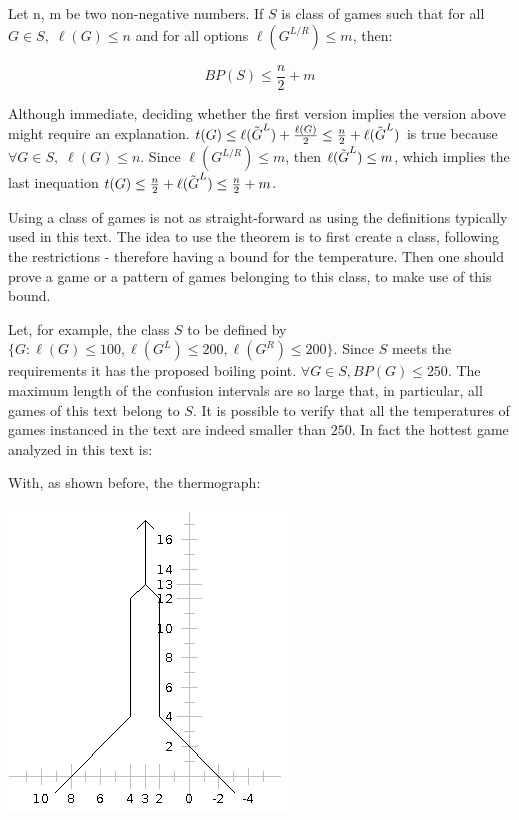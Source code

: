 Let n, m be two non-negative numbers. If $S$ is class of games such that for all $G \in S,\;\ell(G) \leq n$ and for all options $\ell(G^{L/R}) \leq m$, then:

$$
BP(S) \leq \frac{n}{2} + m
$$

Although immediate, deciding whether the first version implies the version above might require an explanation. $t(G) \leq \ell(\tilde{\mbox{$G$}}^L) + \frac{\ell(G)}{2} \leq \frac{n}{2} + \ell(\tilde{\mbox{$G$}}^L)$ is true because $\forall G \in S,\;\ell(G) \leq n$. Since $\ell(G^{L/R}) \leq m$, then $\ell(\tilde{\mbox{$G$}}^L) \leq m$, which implies the last inequation $t(G) \leq \frac{n}{2} + \ell(\tilde{\mbox{$G$}}^L) \leq \frac{n}{2} + m$.

Using a class of games is not as straight-forward as using the definitions typically used in this text. The idea to use the theorem is to first create a class, following the restrictions - therefore having a bound for the temperature. Then one should prove a game or a pattern of games belonging to this class, to make use of this bound.

Let, for example, the class $S$ to be defined by $\{G : \ell(G)\leq100, \ell(G^L)\leq200, \ell(G^R)\leq200\}$. Since $S$ meets the requirements it has the proposed boiling point. $\forall G \in S, BP(G) \leq 250$. The maximum length of the confusion intervals are so large that, in particular, all games of this text belong to $S$. It is possible to verify that all the temperatures of games instanced in the text are indeed smaller than $250$. In fact the hottest game \Gm{} analyzed in this text is:

\begin{center}
\end{center}

With, as shown before, the thermograph:
\begin{center}
	\includegraphics[scale=0.5]{../images/thermA.png}
\end{center}

